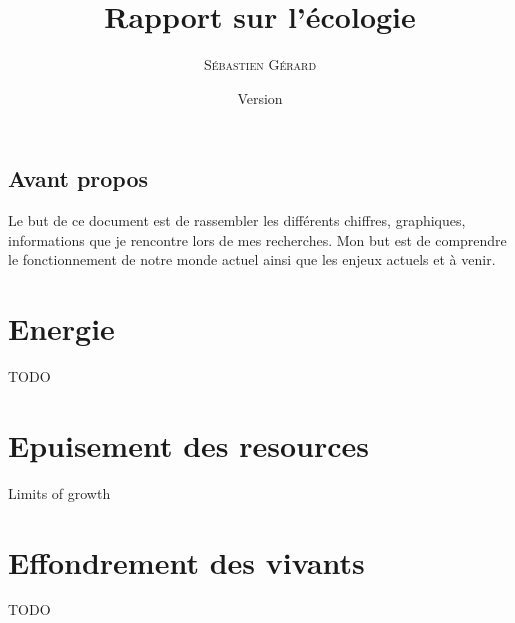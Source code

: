 \documentclass[a4paper,11pt]{book}
\title{\Huge \textbf{Rapport sur l'écologie}}
\date{Version \documentVersion}
\author{\textsc{Sébastien Gérard}}
\makeatletter
\newenvironment{chapquote}[2][2em]
{\setlength{\@tempdima}{#1}%
\def\chapquote@author{#2}%
\parshape 1 \@tempdima \dimexpr\textwidth-2\@tempdima\relax%
\itshape}
{\par\normalfont\hfill--\ \chapquote@author\hspace*{\@tempdima}\par\bigskip}
\makeatother
\begin{document}
    \frontmatter
    \maketitle

    \tableofcontents

    \mainmatter

    \chapter*{Avant propos}

    Le but de ce document est de rassembler les différents chiffres, graphiques, informations que je rencontre lors de mes recherches. Mon but est de comprendre
    le fonctionnement de notre monde actuel ainsi que les enjeux actuels et à venir.


    \part{Energie}

    TODO

    \part{Epuisement des resources}

    Limits of growth \cite{meadows1974limits}

    \part{Effondrement des vivants}

    TODO

%
%
\end{document}
